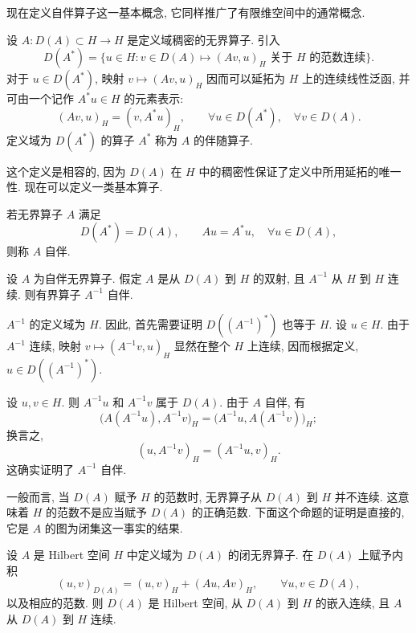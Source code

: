 现在定义自伴算子这一基本概念, 它同样推广了有限维空间中的通常概念.

\begin{Definition}
\label{def:chap2-adjoint-unbounded-operator}
设 $A:D(A)\subset H\to H$ 是定义域稠密的无界算子. 引入
\[
 D(A^*)=\{u\in H:v\in D(A)\longmapsto(Av,u)_H\text{ 关于 }H\text{ 的范数连续}\}.
\]
对于 $u\in D(A^*)$, 映射 $v\mapsto(Av,u)_H$ 因而可以延拓为 $H$ 上的连续线性泛函, 并可由一个记作 $A^*u\in H$ 的元素表示:
\[
 (Av,u)_H=(v,A^*u)_H,
 \qquad\forall u\in D(A^*),\quad\forall v\in D(A).
\]
定义域为 $D(A^*)$ 的算子 $A^*$ 称为 $A$ 的伴随算子.
\end{Definition}

这个定义是相容的, 因为 $D(A)$ 在 $H$ 中的稠密性保证了定义中所用延拓的唯一性. 现在可以定义一类基本算子.

\begin{Definition}
\label{def:chap2-self-adjoint-unbounded-operator}
若无界算子 $A$ 满足
\[
 D(A^*)=D(A),\qquad Au=A^*u,\quad\forall u\in D(A),
\]
则称 $A$ 自伴.
\end{Definition}

\begin{Proposition}
\label{prop:chap2-inverse-self-adjoint}
设 $A$ 为自伴无界算子. 假定 $A$ 是从 $D(A)$ 到 $H$ 的双射, 且 $A^{-1}$ 从 $H$ 到 $H$ 连续. 则有界算子 $A^{-1}$ 自伴.
\end{Proposition}

\begin{Proof}
$A^{-1}$ 的定义域为 $H$. 因此, 首先需要证明 $D((A^{-1})^*)$ 也等于 $H$. 设 $u\in H$. 由于 $A^{-1}$ 连续, 映射 $v\mapsto(A^{-1}v,u)_H$ 显然在整个 $H$ 上连续, 因而根据定义, $u\in D((A^{-1})^*)$.

设 $u,v\in H$. 则 $A^{-1}u$ 和 $A^{-1}v$ 属于 $D(A)$. 由于 $A$ 自伴, 有
\[
 \bigl(A(A^{-1}u),A^{-1}v\bigr)_H
 =\bigl(A^{-1}u,A(A^{-1}v)\bigr)_H;
\]
换言之,
\[
 (u,A^{-1}v)_H=(A^{-1}u,v)_H.
\]
这确实证明了 $A^{-1}$ 自伴.
\end{Proof}

一般而言, 当 $D(A)$ 赋予 $H$ 的范数时, 无界算子从 $D(A)$ 到 $H$ 并不连续. 这意味着 $H$ 的范数不是应当赋予 $D(A)$ 的正确范数. 下面这个命题的证明是直接的, 它是 $A$ 的图为闭集这一事实的结果.

\begin{Proposition}
\label{prop:chap2-graph-norm-hilbert}
设 $A$ 是 Hilbert 空间 $H$ 中定义域为 $D(A)$ 的闭无界算子. 在 $D(A)$ 上赋予内积
\begin{equation}
 (u,v)_{D(A)}=(u,v)_H+(Au,Av)_H,
 \qquad\forall u,v\in D(A),
 \label{eq:chap2-graph-inner-product}
\end{equation}
以及相应的范数. 则 $D(A)$ 是 Hilbert 空间, 从 $D(A)$ 到 $H$ 的嵌入连续, 且 $A$ 从 $D(A)$ 到 $H$ 连续.
\end{Proposition}

